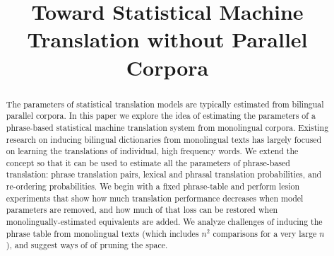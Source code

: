 \documentclass[11pt]{article}
\title{Toward Statistical Machine Translation without Parallel Corpora}
\author{}
\date{}
\begin{document}
\maketitle
\begin{abstract}
The parameters of statistical translation models are typically estimated from bilingual parallel corpora.   In this paper we explore the idea of estimating the parameters of a phrase-based statistical machine translation system from monolingual corpora.  Existing research on inducing bilingual dictionaries from monolingual texts has largely focused on learning the translations of individual, high frequency words.   We extend the concept so that it can be used to estimate all the parameters of phrase-based translation: phrase translation pairs, lexical and phrasal translation probabilities, and re-ordering probabilities.  We begin with a fixed phrase-table and perform lesion experiments that show how much translation performance decreases when model parameters are removed, and how much of that loss can be restored when monolingually-estimated equivalents are added.  We analyze challenges of  inducing the phrase table from monolingual texts (which includes $n^2$ comparisons for a very large $n$), and suggest ways of of pruning the space.




\end{abstract}
\end{document}
